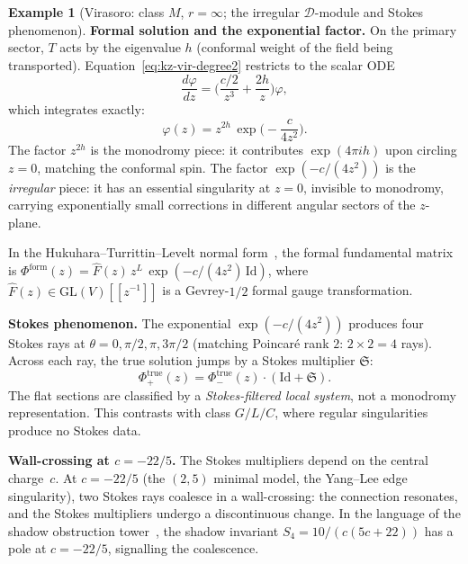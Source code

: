 \documentclass[11pt,reqno]{amsart}
\theoremstyle{definition}
\newtheorem{example}[theorem]{Example}
\theoremstyle{remark}
\newcommand{\cD}{\mathcal{D}}
\numberwithin{equation}{section}
\begin{document}
\begin{example}[Virasoro: class $M$, $r = \infty$;
the irregular $\cD$-module and Stokes phenomenon]
\medskip
\noindent\textbf{Formal solution and the exponential factor.}
On the primary sector, $T$ acts by the eigenvalue $h$
(conformal weight of the field being transported).
Equation~\eqref{eq:kz-vir-degree2} restricts to the scalar ODE
\begin{equation}\label{eq:kz-vir-scalar}
  \frac{d\varphi}{dz}
  = \biggl(\frac{c/2}{z^3} + \frac{2h}{z}\biggr)\varphi,
\end{equation}
which integrates exactly:
\begin{equation}\label{eq:kz-vir-solution}
  \varphi(z)
  = z^{2h}\,\exp\!\biggl(-\frac{c}{4z^2}\biggr).
\end{equation}
The factor $z^{2h}$ is the monodromy piece: it contributes
$\exp(4\pi i h)$ upon circling $z = 0$, matching the
conformal spin. The factor $\exp(-c/(4z^2))$ is the
\emph{irregular} piece: it has an essential singularity
at $z = 0$, invisible to monodromy, carrying exponentially
small corrections in different angular sectors of the
$z$-plane.

In the Hukuhara--Turrittin--Levelt normal
form~\cite{Wasow65,Sabbah13},
the formal fundamental matrix is
$\Phi^{\mathrm{form}}(z)
= \widehat{F}(z)\,z^{L}\,
  \exp(-c/(4z^2)\,\mathrm{Id})$,
where $\widehat{F}(z) \in \mathrm{GL}(V)[[z^{-1}]]$
is a Gevrey-$1/2$ formal gauge transformation.

\medskip
\noindent\textbf{Stokes phenomenon.}
The exponential $\exp(-c/(4z^2))$ produces four Stokes rays
at $\theta = 0, \pi/2, \pi, 3\pi/2$ (matching Poincar\'e
rank $2$: $2 \times 2 = 4$ rays).
Across each ray, the true solution jumps by a Stokes
multiplier $\mathfrak{S}$:
\begin{equation}\label{eq:stokes-vir}
  \Phi_+^{\mathrm{true}}(z)
  = \Phi_-^{\mathrm{true}}(z)
  \cdot
  (\mathrm{Id} + \mathfrak{S}).
\end{equation}
The flat sections are classified by a
\emph{Stokes-filtered local system}, not a monodromy
representation. This contrasts with class $G/L/C$, where
regular singularities produce no Stokes data.

\medskip
\noindent\textbf{Wall-crossing at $c = -22/5$.}
The Stokes multipliers depend on the central charge~$c$.
At $c = -22/5$ (the $(2,5)$ minimal model, the Yang--Lee
edge singularity), two Stokes rays coalesce in a
wall-crossing: the connection resonates, and the Stokes
multipliers undergo a discontinuous change. In the language
of the shadow obstruction tower~\cite{Lorgat26I},
the shadow invariant $S_4 = 10/(c(5c+22))$ has a pole
at $c = -22/5$, signalling the coalescence.


\end{example}
\end{document}

